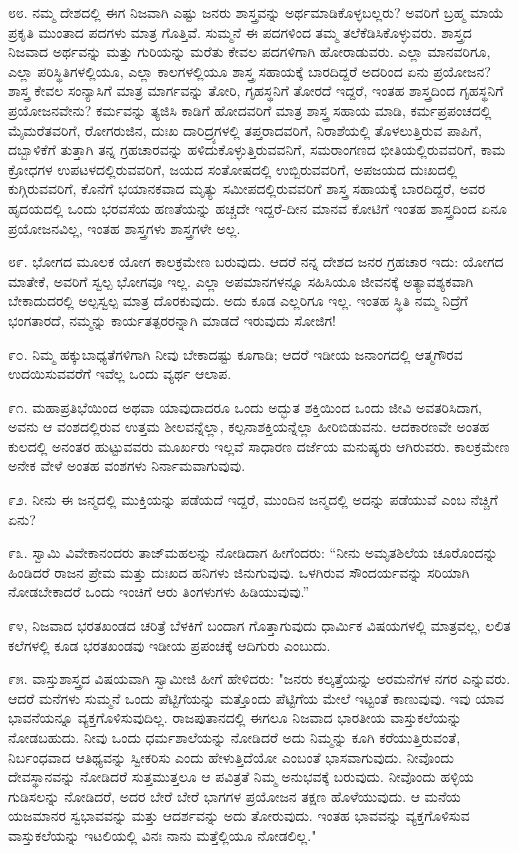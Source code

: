 ೮೮. ನಮ್ಮ ದೇಶದಲ್ಲಿ ಈಗ ನಿಜವಾಗಿ ಎಷ್ಟು ಜನರು ಶಾಸ್ತ್ರವನ್ನು ಅರ್ಥಮಾಡಿಕೊಳ್ಳಬಲ್ಲರು? ಅವರಿಗೆ ಬ್ರಹ್ಮ ಮಾಯೆ ಪ್ರಕೃತಿ ಮುಂತಾದ ಪದಗಳು ಮಾತ್ರ ಗೊತ್ತಿವೆ. ಸುಮ್ಮನೆ ಈ ಪದಗಳಿಂದ ತಮ್ಮ ತಲೆಕೆಡಿಸಿಕೊಳ್ಳುವರು. ಶಾಸ್ತ್ರದ ನಿಜವಾದ ಅರ್ಥವನ್ನು ಮತ್ತು ಗುರಿಯನ್ನು ಮರೆತು ಕೇವಲ ಪದಗಳಿಗಾಗಿ ಹೋರಾಡುವರು. ಎಲ್ಲಾ ಮಾನವರಿಗೂ, ಎಲ್ಲಾ ಪರಿಸ್ಥಿತಿಗಳಲ್ಲಿಯೂ, ಎಲ್ಲಾ ಕಾಲಗಳಲ್ಲಿಯೂ ಶಾಸ್ತ್ರ ಸಹಾಯಕ್ಕೆ ಬಾರದಿದ್ದರೆ ಅದರಿಂದ ಏನು ಪ್ರಯೋಜನ? ಶಾಸ್ತ್ರ ಕೇವಲ ಸಂನ್ಯಾಸಿಗೆ ಮಾತ್ರ ಮಾರ್ಗವನ್ನು ತೋರಿ, ಗೃಹಸ್ಥನಿಗೆ ತೋರದೆ ಇದ್ದರೆ, ಇಂತಹ ಶಾಸ್ತ್ರದಿಂದ ಗೃಹಸ್ಥನಿಗೆ ಪ್ರಯೋಜನವೇನು? ಕರ್ಮವನ್ನು ತ್ಯಜಿಸಿ ಕಾಡಿಗೆ ಹೋದವರಿಗೆ ಮಾತ್ರ ಶಾಸ್ತ್ರ ಸಹಾಯ ಮಾಡಿ, ಕರ್ಮಪ್ರಪಂಚದಲ್ಲಿ ಮೈಮರೆತವರಿಗೆ, ರೋಗರುಜಿನ, ದುಃಖ ದಾರಿದ್ರ್ಯಗಳಲ್ಲಿ ತಪ್ತರಾದವರಿಗೆ, ನಿರಾಶೆಯಲ್ಲಿ ತೊಳಲುತ್ತಿರುವ ಪಾಪಿಗೆ, ದಬ್ಬಾಳಿಕೆಗೆ ತುತ್ತಾಗಿ ತನ್ನ ಗ್ರಹಚಾರವನ್ನು ಹಳಿದುಕೊಳ್ಳುತ್ತಿರುವವನಿಗೆ, ಸಮರಾಂಗಣದ ಭೀತಿಯಲ್ಲಿರುವವರಿಗೆ, ಕಾಮ ಕ್ರೋಧಗಳ ಉಪಟಳದಲ್ಲಿರುವವರಿಗೆ, ಜಯದ ಸಂತೋಷದಲ್ಲಿ ಉಬ್ಬಿರುವವರಿಗೆ, ಅಪಜಯದ ದುಃಖದಲ್ಲಿ ಕುಗ್ಗಿರುವವರಿಗೆ, ಕೊನೆಗೆ ಭಯಾನಕವಾದ ಮೃತ್ಯು ಸಮೀಪದಲ್ಲಿರುವವರಿಗೆ ಶಾಸ್ತ್ರ ಸಹಾಯಕ್ಕೆ ಬಾರದಿದ್ದರೆ, ಅವರ ಹೃದಯದಲ್ಲಿ ಒಂದು ಭರವಸೆಯ ಹಣತೆಯನ್ನು ಹಚ್ಚದೇ ಇದ್ದರೆ-ದೀನ ಮಾನವ ಕೋಟಿಗೆ ಇಂತಹ ಶಾಸ್ತ್ರದಿಂದ ಏನೂ ಪ್ರಯೋಜನವಿಲ್ಲ, ಇಂತಹ ಶಾಸ್ತ್ರಗಳು ಶಾಸ್ತ್ರಗಳೇ ಅಲ್ಲ.

೮೯. ಭೋಗದ ಮೂಲಕ ಯೋಗ ಕಾಲಕ್ರಮೇಣ ಬರುವುದು. ಆದರೆ ನನ್ನ ದೇಶದ ಜನರ ಗ್ರಹಚಾರ ಇದು: ಯೋಗದ ಮಾತೇಕೆ, ಅವರಿಗೆ ಸ್ವಲ್ಪ ಭೋಗವೂ ಇಲ್ಲ. ಎಲ್ಲಾ ಅಪಮಾನಗಳನ್ನೂ ಸಹಿಸಿಯೂ ಜೀವನಕ್ಕೆ ಅತ್ಯಾವಶ್ಯಕವಾಗಿ ಬೇಕಾದುದರಲ್ಲಿ ಅಲ್ಪಸ್ವಲ್ಪ ಮಾತ್ರ ದೊರಕುವುದು. ಅದು ಕೂಡ ಎಲ್ಲರಿಗೂ ಇಲ್ಲ. ಇಂತಹ ಸ್ಥಿತಿ ನಮ್ಮ ನಿದ್ರೆಗೆ ಭಂಗತಾರದೆ, ನಮ್ಮನ್ನು ಕಾರ್ಯತತ್ಪರರನ್ನಾಗಿ ಮಾಡದೆ ಇರುವುದು ಸೋಜಿಗ!

೯೦. ನಿಮ್ಮ ಹಕ್ಕುಬಾಧ್ಯತೆಗಳಿಗಾಗಿ ನೀವು ಬೇಕಾದಷ್ಟು ಕೂಗಾಡಿ; ಆದರೆ ಇಡೀಯ ಜನಾಂಗದಲ್ಲಿ ಆತ್ಮಗೌರವ ಉದಯಿಸುವವರೆಗೆ ಇವೆಲ್ಲ ಒಂದು ವ್ಯರ್ಥ ಆಲಾಪ.

೯೧. ಮಹಾಪ್ರತಿಭೆಯಿಂದ ಅಥವಾ ಯಾವುದಾದರೂ ಒಂದು ಅದ್ಭುತ ಶಕ್ತಿಯಿಂದ ಒಂದು ಜೀವಿ ಅವತರಿಸಿದಾಗ, ಅವನು ಆ ವಂಶದಲ್ಲಿರುವ ಉತ್ತಮ ಶೀಲವನ್ನೆಲ್ಲಾ, ಕಲ್ಪನಾಶಕ್ತಿಯನ್ನೆಲ್ಲಾ ಹೀರಿಬಿಡುವನು. ಆದಕಾರಣವೇ ಅಂತಹ ಕುಲದಲ್ಲಿ ಅನಂತರ ಹುಟ್ಟುವವರು ಮೂರ್ಖರು ಇಲ್ಲವೆ ಸಾಧಾರಣ ದರ್ಜೆಯ ಮನುಷ್ಯರು ಆಗಿರುವರು. ಕಾಲಕ್ರಮೇಣ ಅನೇಕ ವೇಳೆ ಅಂತಹ ವಂಶಗಳು ನಿರ್ನಾಮವಾಗುವುವು.

೯೨. ನೀನು ಈ ಜನ್ಮದಲ್ಲಿ ಮುಕ್ತಿಯನ್ನು ಪಡೆಯದೆ ಇದ್ದರೆ, ಮುಂದಿನ ಜನ್ಮದಲ್ಲಿ ಅದನ್ನು ಪಡೆಯುವೆ ಎಂಬ ನೆಚ್ಚಿಗೆ ಏನು?

೯೩. ಸ್ವಾಮಿ ವಿವೇಕಾನಂದರು ತಾಜ್‌ಮಹಲನ್ನು ನೋಡಿದಾಗ ಹೀಗೆಂದರು: “ನೀನು ಅಮೃತಶಿಲೆಯ ಚೂರೊಂದನ್ನು ಹಿಂಡಿದರೆ ರಾಜನ ಪ್ರೇಮ ಮತ್ತು ದುಃಖದ ಹನಿಗಳು ಜಿನುಗುವುವು. ಒಳಗಿರುವ ಸೌಂದರ್ಯವನ್ನು ಸರಿಯಾಗಿ ನೋಡಬೇಕಾದರೆ ಒಂದು ಇಂಚಿಗೆ ಆರು ತಿಂಗಳುಗಳು ಹಿಡಿಯುವುವು.”

೯೪, ನಿಜವಾದ ಭರತಖಂಡದ ಚರಿತ್ರೆ ಬೆಳಕಿಗೆ ಬಂದಾಗ ಗೊತ್ತಾಗುವುದು ಧಾರ್ಮಿಕ ವಿಷಯಗಳಲ್ಲಿ ಮಾತ್ರವಲ್ಲ, ಲಲಿತ ಕಲೆಗಳಲ್ಲಿ ಕೂಡ ಭರತಖಂಡವು ಇಡೀಯ ಪ್ರಪಂಚಕ್ಕೆ ಆದಿಗುರು ಎಂಬುದು.

೯೫. ವಾಸ್ತುಶಾಸ್ತ್ರದ  ವಿಷಯವಾಗಿ ಸ್ವಾಮೀಜಿ ಹೀಗೆ ಹೇಳಿದರು: "ಜನರು ಕಲ್ಕತ್ತೆಯನ್ನು ಅರಮನೆಗಳ ನಗರ ಎನ್ನುವರು. ಆದರೆ ಮನೆಗಳು ಸುಮ್ಮನೆ ಒಂದು ಪೆಟ್ಟಿಗೆಯನ್ನು ಮತ್ತೊಂದು ಪೆಟ್ಟಿಗೆಯ ಮೇಲೆ ಇಟ್ಟಂತೆ ಕಾಣುವುವು. ಇವು ಯಾವ ಭಾವನೆಯನ್ನೂ ವ್ಯಕ್ತಗೊಳಿಸುವುದಿಲ್ಲ. ರಾಜಪುತಾನದಲ್ಲಿ ಈಗಲೂ ನಿಜವಾದ ಭಾರತೀಯ ವಾಸ್ತುಕಲೆಯನ್ನು ನೋಡಬಹುದು. ನೀವು ಒಂದು ಧರ್ಮಶಾಲೆಯನ್ನು ನೋಡಿದರೆ ಅದು ನಿಮ್ಮನ್ನು ಕೂಗಿ ಕರೆಯುತ್ತಿರುವಂತೆ, ನಿರ್ಬಂಧವಾದ ಆತಿಥ್ಯವನ್ನು ಸ್ವೀಕರಿಸು ಎಂದು ಹೇಳುತ್ತಿದೆಯೋ ಎಂಬಂತೆ ಭಾಸವಾಗುವುದು. ನೀವೊಂದು ದೇವಸ್ಥಾನವನ್ನು ನೋಡಿದರೆ ಸುತ್ತಮುತ್ತಲೂ ಆ ಪವಿತ್ರತೆ ನಿಮ್ಮ ಅನುಭವಕ್ಕೆ ಬರುವುದು. ನೀವೊಂದು ಹಳ್ಳಿಯ ಗುಡಿಸಲನ್ನು ನೋಡಿದರೆ, ಅದರ ಬೇರೆ ಬೇರೆ ಭಾಗಗಳ ಪ್ರಯೋಜನ ತಕ್ಷಣ ಹೊಳೆಯುವುದು. ಆ ಮನೆಯ ಯಜಮಾನರ ಸ್ವಭಾವವನ್ನು ಮತ್ತು ಆದರ್ಶವನ್ನು ಅದು ತೋರುವುದು. ಇಂತಹ ಭಾವವನ್ನು ವ್ಯಕ್ತಗೊಳಿಸುವ ವಾಸ್ತುಕಲೆಯನ್ನು ಇಟಲಿಯಲ್ಲಿ ವಿನಃ ನಾನು ಮತ್ತೆಲ್ಲಿಯೂ ನೋಡಲಿಲ್ಲ."

